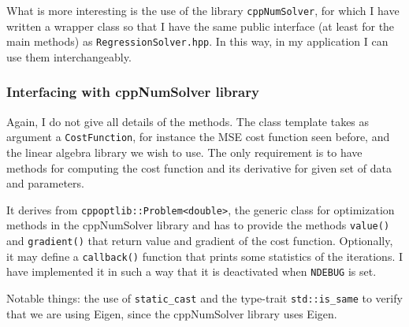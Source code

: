 \documentclass{article}
\newcommand{\li}{\lstinline}
\begin{document}
What is more interesting is the use of the library \texttt{cppNumSolver}, for which I have written a wrapper class
so that I have the same  public interface (at least for the main methods) as \texttt{RegressionSolver.hpp}. In this way, in my application I can use them interchangeably.
\subsubsection{Interfacing with cppNumSolver library}
Again, I do not give all details of the methods. The class template takes as argument a \li!CostFunction!, for instance the MSE cost function seen before, and the linear algebra library we wish to use.
The only requirement is to have methods for computing the cost function
and its derivative for given set of data and parameters.

It derives from \li!cppoptlib::Problem<double>!, the generic
class for optimization methods in the cppNumSolver library and has to
provide the methods \li!value()! and \li!gradient()! that return
value and gradient of the cost function. Optionally, it may define
a \li!callback()! function that prints some statistics of the
iterations. I have implemented it in such a way that it is  deactivated when \li!NDEBUG! is set.

Notable things: the use of \li!static_cast! and the type-trait
\li!std::is_same! to verify
that we are using Eigen, since the cppNumSolver library uses Eigen.
\end{document}
